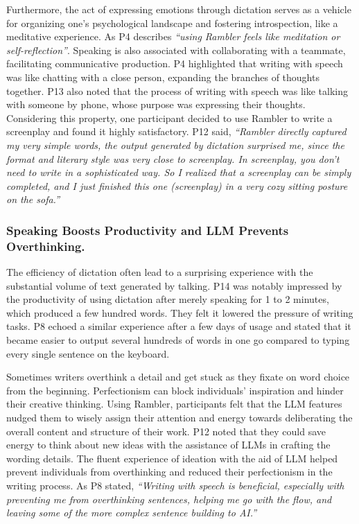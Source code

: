 Furthermore, the act of expressing emotions through dictation serves as a vehicle for organizing one's psychological landscape and fostering introspection, like a meditative experience.
As P4 describes \textit{``using Rambler feels like meditation or self-reflection''}.
Speaking is also associated with collaborating with a teammate, facilitating communicative production.
P4 highlighted that writing with speech was like chatting with a close person, expanding the branches of thoughts together. P13 also noted that the process of writing with speech was like talking with someone by phone, whose purpose was expressing their thoughts.
Considering this property, one participant decided to use Rambler to write a screenplay and found it highly satisfactory. P12 said, \textit{``Rambler directly captured my very simple words, the output generated by dictation surprised me, since the format and literary style was very close to screenplay. In screenplay, you don't need to write in a sophisticated way. So I realized that a screenplay can be simply completed, and I just finished this one (screenplay) in a very cozy sitting posture on the sofa.''}


\vspace{-2mm}
\subsubsection{Speaking Boosts Productivity and LLM Prevents Overthinking.}

The efficiency of dictation
often lead to a surprising experience with the substantial volume of text generated by talking. P14 was notably impressed by the productivity of using dictation
after merely speaking for 1 to 2 minutes, which produced a few hundred words.
They felt it lowered the pressure of writing tasks. P8 echoed a similar experience after a few days of usage and stated that it became easier to output several hundreds of words in one go compared to typing every single sentence on the keyboard.


Sometimes writers overthink a detail and get stuck as they fixate on word choice from the beginning. Perfectionism can block individuals’ inspiration and hinder their creative thinking. Using Rambler, participants felt that the LLM features nudged them to wisely assign their attention and energy towards deliberating the overall content and structure of their work.
P12 noted that they could save energy to think about new ideas with the assistance of LLMs in crafting the wording details. The fluent experience of ideation with the aid of LLM helped prevent individuals from overthinking and reduced their perfectionism in the writing process.
As P8 stated, \textit{``Writing with speech is beneficial, especially with preventing me from overthinking sentences, helping me go with the flow, and leaving some of the more complex sentence building to AI.''}

